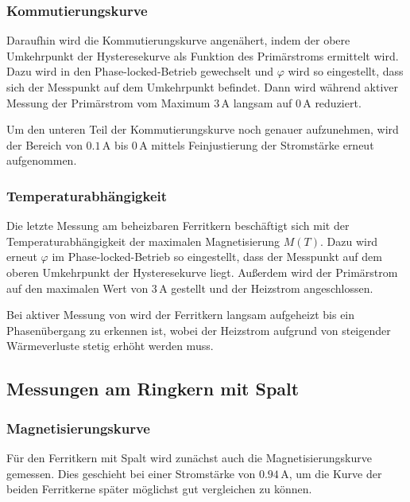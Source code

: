 \documentclass[12pt,a4paper]{scrartcl}
\numberwithin{equation}{section} %
\renewcommand{\[}{} %
\renewcommand{\]}{\noindent} %
\begin{document}
\hypertarget{kommutierungskurve}{%
\subsubsection{Kommutierungskurve}\label{kommutierungskurve}}
Daraufhin wird die Kommutierungskurve angenähert, indem der obere Umkehrpunkt der Hysteresekurve als Funktion des Primärstroms ermittelt wird. Dazu wird in den Phase-locked-Betrieb gewechselt und \(\varphi\) wird so eingestellt, dass sich der Messpunkt auf dem Umkehrpunkt befindet. Dann wird während aktiver Messung der Primärstrom vom Maximum \(3\,\mathrm A\) langsam auf \(0\,\mathrm A\) reduziert.

Um den unteren Teil der Kommutierungskurve noch genauer aufzunehmen, wird der Bereich von \(0.1\,\mathrm A\) bis \(0\,\mathrm A\) mittels Feinjustierung der Stromstärke erneut aufgenommen.

\hypertarget{temperaturabhuxe4ngigkeit}{%
\subsubsection{Temperaturabhängigkeit}\label{temperaturabhuxe4ngigkeit}}
Die letzte Messung am beheizbaren Ferritkern beschäftigt sich mit der Temperaturabhängigkeit der maximalen Magnetisierung \(M(T)\). Dazu wird erneut \(\varphi\) im Phase-locked-Betrieb so eingestellt, dass der Messpunkt auf dem oberen Umkehrpunkt der Hysteresekurve liegt. Außerdem wird der Primärstrom auf den maximalen Wert von \(3\,\mathrm A\) gestellt und der Heizstrom angeschlossen.

Bei aktiver Messung von wird der Ferritkern langsam aufgeheizt bis ein Phasenübergang zu erkennen ist, wobei der Heizstrom aufgrund von steigender Wärmeverluste stetig erhöht werden muss.

\hypertarget{messungen-am-ringkern-mit-spalt}{%
\subsection{Messungen am Ringkern mit Spalt}\label{messungen-am-ringkern-mit-spalt}}

\hypertarget{magnetisierungskurve-1}{%
\subsubsection{Magnetisierungskurve}\label{magnetisierungskurve-1}}

Für den Ferritkern mit Spalt wird zunächst auch die Magnetisierungskurve gemessen. Dies geschieht bei einer Stromstärke von \(0.94\,\mathrm A\), um die Kurve der beiden Ferritkerne später möglichst gut vergleichen zu können.
\end{document}
